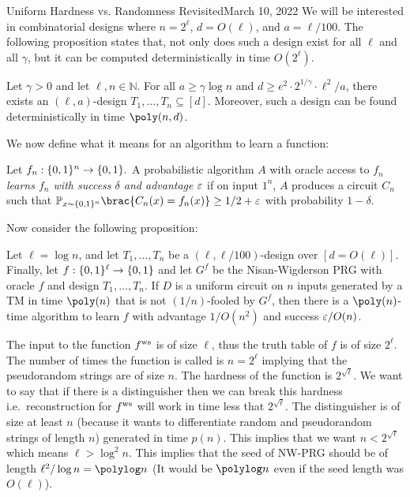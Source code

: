 \begin{lecture}{8}{Uniform Hardness vs. Randomness Revisited}{March 10, 2022}
We will be interested in combinatorial designs where $n = 2^\ell$, $d =
O(\ell)$, and $a = \ell/100$. The following proposition states that, not only does such a design exist for all $\ell$ and all $\gamma$, but it can be computed deterministically in time $O(2^\ell)$.

\begin{proposition} \label{prop:comb-design}
	Let $\gamma > 0 $ and let $\ell, n \in \mathbb{N}$. For all $a \ge \gamma
	\log{n}$ and $d \ge e^2 \cdot 2^{1/\gamma} \cdot \ell^2/a$, there exists an
	$(\ell, a)$-design $T_1, \dots, T_n \subseteq [d]$. Moreover, such a design
	can be found deterministically in time $\poly(n, d)$.
\end{proposition}

We now define what it means for an algorithm to learn a function:
\begin{definition}
	Let $f_n : \{0, 1\}^n \to \{0, 1\}.$ A probabilistic algorithm $A$ with
	oracle access to $f_n$ \emph{learns $f_n$ with success $\delta$ and advantage
		$\varepsilon$} if on input $1^n$, $A$ produces a circuit $C_n$ such that
	$\Pr_{x \sim \{0, 1\}^n} \brac{C_n(x) = f_n(x)} \geq 1/2 + \eps$ with
	probability $1 - \delta$.
\end{definition}

Now consider the following proposition:

\begin{proposition}\label{prop:learning-func}
	Let $\ell = \log{n}$, and let $T_1, \dots, T_n$ be
	a $(\ell, \ell/100)$-design over $[d=O(\ell)]$. Finally, let $f :
	\{0,1\}^\ell \to \{0, 1\}$ and let $G^f$ be the Nisan-Wigderson PRG with
	oracle $f$ and design $T_1, \dots, T_n$. If $D$ is a uniform circuit on $n$
	inputs generated by a TM in time $\poly(n)$ that is not $(1/n)$-fooled by $G^f$, then
	there is a $\poly(n)$-time algorithm to learn $f$ with advantage $1/O(n^2)$ and
	success $\varepsilon/O(n)$.
\end{proposition}

The input to the function $ f^{\text{ws}} $ is of size $\ell$, thus the truth table of $f$ is of size $2^{\ell}$. The number of times the function is called is $n = 2^{\ell}$ implying that the pseudorandom strings are of size $n$.
The hardness of the function is $2^{\sqrt{\ell}}$. We want to say that if there is a distinguisher then we can break this hardness i.e.\ reconstruction for $ f^{\text{ws}} $ will work in time less that $2^{\sqrt{\ell}}$.
The distinguisher is of size at least $n$ (because it wants to differentiate random and pseudorandom strings of length $n$) generated in time $p(n)$. This implies that we want $n < 2^{\sqrt{\ell}}$ which means $\ell > \log^2 n$. This implies that the seed of NW-PRG should be of length $\ell^2/\log n = \polylog n$ (It would be $\polylog n$ even if the seed length was $O(\ell)$).


\end{lecture}

